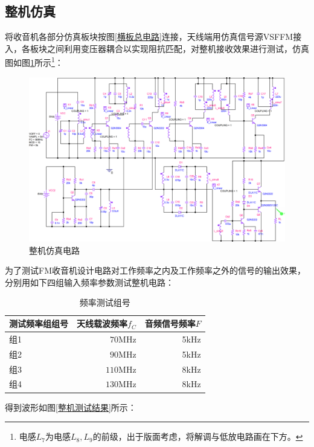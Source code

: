 \documentclass[a4paper,12pt,twoside]{article}
\begin{document}
\subsection{整机仿真}
将收音机各部分仿真板块按图\ref{横板总电路}连接，天线端用仿真信号源VSFFM接入，各板块之间利用变压器耦合以实现阻抗匹配，对整机接收效果进行测试，仿真图如图\ref{整机仿真}所示\footnote{电感$L_7$为电感$L_8,L_9$的前级，出于版面考虑，将解调与低放电路画在下方。}：
\begin{figure}[H]
    \centering
    \includegraphics[scale=0.11]{整机仿真.png}
    \caption{整机仿真电路}
    \label{整机仿真}
\end{figure}

为了测试FM收音机设计电路对工作频率之内及工作频率之外的信号的输出效果，分别用如下四组输入频率参数测试整机电路：
\begin{table}[H]
    \centering
    \begin{tabular}{p{5cm}rr}
    \toprule[1.2pt]
    \midrule
    测试频率组组号 & 天线载波频率$f_C$  &   音频信号频率$F$  \\
         \midrule
                 组1 & $70\mathrm{MHz}$   &  5kHz \\
         组2 &   $90\mathrm{MHz}$   &  5kHz \\
         组3 &   $110\mathrm{MHz}$   & 8kHz  \\
         组4&   $130\mathrm{MHz}$   &  8kHz \\
         \bottomrule[1.2pt]
    \end{tabular}
    \caption{频率测试组号}
    \label{整机测试}
\end{table}
得到波形如图\ref{整机测试结果}所示：
\end{document}
